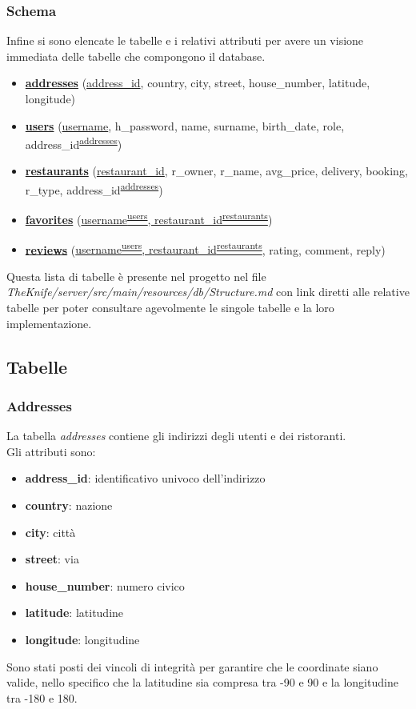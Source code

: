 \subsubsection{Schema}
Infine si sono elencate le tabelle e i relativi attributi 
per avere un visione immediata delle tabelle che compongono il database.
\begin{itemize}
    \item \textbf{\hyperref[sec:addresses]{addresses}} (\underline{address\_id}, country, city, street, house\_number, latitude, longitude)
    \item \textbf{\hyperref[sec:users]{users}} (\underline{username}, h\_password, name, surname, birth\_date, role, address\_id\textsuperscript{\hyperref[sec:addresses]{addresses}})
    \item \textbf{\hyperref[sec:restaurants]{restaurants}} (\underline{restaurant\_id}, r\_owner, r\_name, avg\_price, delivery, booking, r\_type, address\_id\textsuperscript{\hyperref[sec:addresses]{addresses}})
    \item \textbf{\hyperref[sec:favorites]{favorites}} (\underline{username\textsuperscript{\hyperref[sec:users]{users}}, restaurant\_id\textsuperscript{\hyperref[sec:restaurants]{restaurants}}})
    \item \textbf{\hyperref[sec:reviews]{reviews}} (\underline{username\textsuperscript{\hyperref[sec:users]{users}}, restaurant\_id\textsuperscript{\hyperref[sec:restaurants]{restaurants}}}, rating, comment, reply)
\end{itemize}
Questa lista di tabelle è presente nel progetto nel file 
\textit{TheKnife/server/src/main/resources/db/Structure.md} 
con link diretti alle relative tabelle per poter consultare 
agevolmente le singole tabelle e la loro implementazione.

\subsection{Tabelle}
\subsubsection{Addresses}
\label{sec:addresses}
La tabella \textit{addresses} contiene gli indirizzi degli 
utenti e dei ristoranti.\\
Gli attributi sono:
\begin{itemize}
    \item \textbf{address\_id}: identificativo univoco dell'indirizzo
    \item \textbf{country}: nazione
    \item \textbf{city}: città
    \item \textbf{street}: via
    \item \textbf{house\_number}: numero civico
    \item \textbf{latitude}: latitudine
    \item \textbf{longitude}: longitudine
\end{itemize}
Sono stati posti dei vincoli di integrità per garantire che 
le coordinate siano valide, nello specifico che la latitudine
sia compresa tra -90 e 90 e la longitudine tra -180 e 180.

